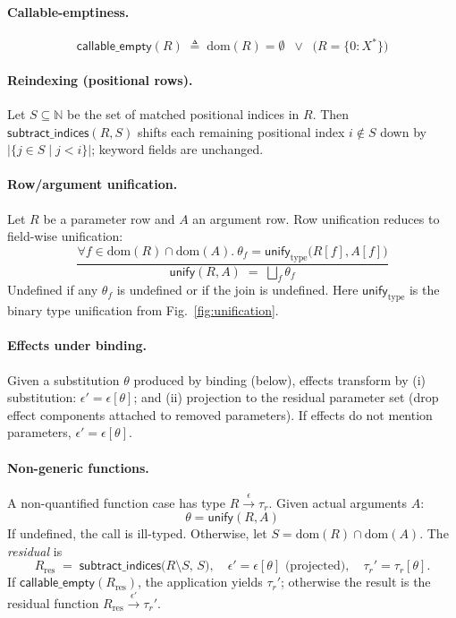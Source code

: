 \paragraph{Callable-emptiness.}
\[
\mathsf{callable\_empty}(R) \;\triangleq\; \mathrm{dom}(R)=\emptyset \;\;\lor\;\;
\bigl(R=\{0:X^*\}\bigr)
\]

\paragraph{Reindexing (positional rows).}
Let $S \subseteq \mathbb{N}$ be the set of matched positional indices in $R$.
Then $\mathsf{subtract\_indices}(R,S)$ shifts each remaining positional index $i\notin S$
down by $|\{j\in S \mid j<i\}|$; keyword fields are unchanged.

\paragraph{Row/argument unification.}
Let $R$ be a parameter row and $A$ an argument row. Row unification reduces to
field-wise unification:
\[
\frac{
  \forall f \in \mathrm{dom}(R)\cap\mathrm{dom}(A).~ \theta_f = \mathsf{unify}_{\text{type}}\bigl(R[f],A[f]\bigr)
}{
  \mathsf{unify}(R,A) \;=\; \bigsqcup_{f} \theta_f
}
\]
Undefined if any $\theta_f$ is undefined or if the join is undefined.
Here $\mathsf{unify}_{\text{type}}$ is the binary type unification from Fig.~\ref{fig:unification}.

\paragraph{Effects under binding.}
Given a substitution $\theta$ produced by binding (below), effects transform by
(i) substitution: $\epsilon' = \epsilon[\theta]$; and (ii) projection to the residual
parameter set (drop effect components attached to removed parameters). If effects do
not mention parameters, $\epsilon'=\epsilon[\theta]$.

\paragraph{Non-generic functions.}
A non-quantified function case has type $R \xrightarrow{\epsilon} \tau_r$.
Given actual arguments $A$:
\[
\theta = \mathsf{unify}(R,A)
\]
If undefined, the call is ill-typed. Otherwise,
let $S=\mathrm{dom}(R)\cap\mathrm{dom}(A)$. The \emph{residual} is
\[
R_{\mathrm{res}} \;=\; \mathsf{subtract\_indices}\bigl(R\setminus S,\, S\bigr),\quad
\epsilon'=\epsilon[\theta]\text{ (projected)},\quad
\tau_r'=\tau_r[\theta].
\]
If $\mathsf{callable\_empty}(R_{\mathrm{res}})$, the application yields $\tau_r'$;
otherwise the result is the residual function $R_{\mathrm{res}} \xrightarrow{\epsilon'} \tau_r'$.

